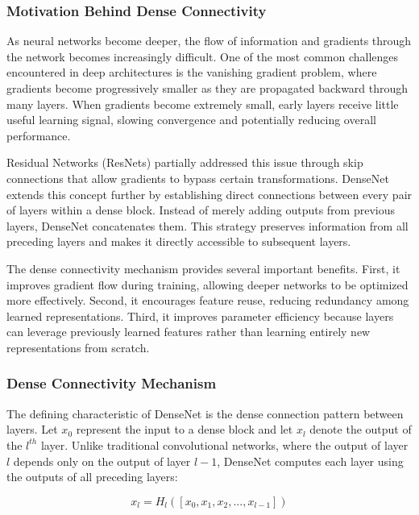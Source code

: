 \subsubsection{Motivation Behind Dense Connectivity}

As neural networks become deeper, the flow of information and gradients through the network becomes increasingly difficult. One of the most common challenges encountered in deep architectures is the vanishing gradient problem, where gradients become progressively smaller as they are propagated backward through many layers. When gradients become extremely small, early layers receive little useful learning signal, slowing convergence and potentially reducing overall performance.

Residual Networks (ResNets) partially addressed this issue through skip connections that allow gradients to bypass certain transformations. DenseNet extends this concept further by establishing direct connections between every pair of layers within a dense block. Instead of merely adding outputs from previous layers, DenseNet concatenates them. This strategy preserves information from all preceding layers and makes it directly accessible to subsequent layers.

The dense connectivity mechanism provides several important benefits. First, it improves gradient flow during training, allowing deeper networks to be optimized more effectively. Second, it encourages feature reuse, reducing redundancy among learned representations. Third, it improves parameter efficiency because layers can leverage previously learned features rather than learning entirely new representations from scratch.

\subsubsection{Dense Connectivity Mechanism}

The defining characteristic of DenseNet is the dense connection pattern between layers. Let $x_0$ represent the input to a dense block and let $x_l$ denote the output of the $l^{th}$ layer. Unlike traditional convolutional networks, where the output of layer $l$ depends only on the output of layer $l-1$, DenseNet computes each layer using the outputs of all preceding layers:

\begin{equation}
	x_l = H_l([x_0, x_1, x_2, ..., x_{l-1}])
\end{equation}

